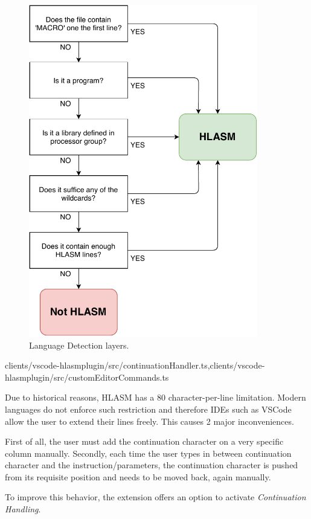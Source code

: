 \begin{figure}
	\centering
	\includegraphics[width=10cm]{img/lang_detection}
	\caption{Language Detection layers.}
	
	\label{fig08:lang}
\end{figure}

{clients/vscode-hlasmplugin/src/continuationHandler.ts,clients/vscode-hlasmplugin/src/customEditorCommands.ts}

Due to historical reasons, HLASM has a 80 character-per-line limitation. Modern languages do not enforce such restriction and therefore IDEs such as VSCode allow the user to extend their lines freely. This causes 2 major inconveniences.

First of all, the user must add the continuation character on a very specific column manually. Secondly, each time the user types in between continuation character and the instruction/parameters, the continuation character is pushed from its requisite position and needs to be moved back, again manually.

To improve this behavior, the extension offers an option to activate \emph{Continuation Handling}. 


